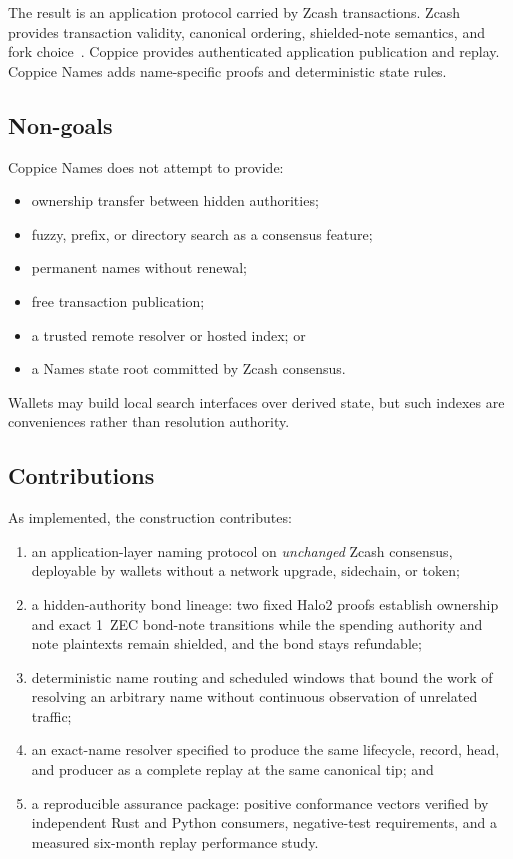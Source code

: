 \documentclass[11pt]{article}
\begin{document}
The result is an application protocol carried by Zcash transactions. Zcash
provides transaction validity, canonical ordering, shielded-note semantics,
and fork choice~\cite{zcash-protocol,zip258}. Coppice provides authenticated
application publication and replay. Coppice Names adds name-specific proofs
and deterministic state rules.

\subsection{Non-goals}

Coppice Names does not attempt to provide:

\begin{itemize}
\item ownership transfer between hidden authorities;
\item fuzzy, prefix, or directory search as a consensus feature;
\item permanent names without renewal;
\item free transaction publication;
\item a trusted remote resolver or hosted index; or
\item a Names state root committed by Zcash consensus.
\end{itemize}

Wallets may build local search interfaces over derived state, but such indexes
are conveniences rather than resolution authority.

\subsection{Contributions}

As implemented, the construction contributes:

\begin{enumerate}
\item an application-layer naming protocol on \emph{unchanged} Zcash
consensus, deployable by wallets without a network upgrade, sidechain, or
token;
\item a hidden-authority bond lineage: two fixed Halo2 proofs establish
ownership and exact 1~ZEC bond-note transitions while the spending authority
and note plaintexts remain shielded, and the bond stays refundable;
\item deterministic name routing and scheduled windows that bound the work of
resolving an arbitrary name without continuous observation of unrelated
traffic;
\item an exact-name resolver specified to produce the same lifecycle, record,
head, and producer as a complete replay at the same canonical tip; and
\item a reproducible assurance package: positive conformance vectors verified
by independent Rust and Python consumers, negative-test requirements, and a
measured six-month replay performance study.
\end{enumerate}
\end{document}
